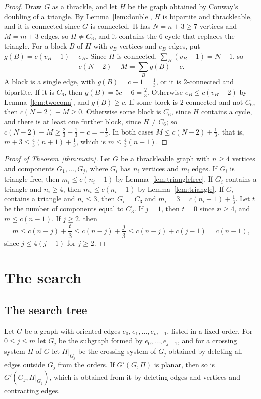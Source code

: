 \documentclass[11pt]{amsart}
\theoremstyle{definition}
\theoremstyle{remark}
\numberwithin{equation}{section}
\begin{document}
\begin{proof}
Draw $G$ as a thrackle, and let $H$ be the graph obtained by Conway's doubling of a triangle. By Lemma~\ref{lem:double}, $H$ is bipartite and thrackleable, and it is connected since $G$ is connected. It has $N=n+3\ge7$ vertices and $M=m+3$ edges, so $H\ne C_6$, and it contains the $6$-cycle that replaces the triangle. For a block $B$ of $H$ with $v_B$ vertices and $e_B$ edges, put $g(B)=c(v_B-1)-e_B$. Since $H$ is connected, $\sum_B(v_B-1)=N-1$, so
\[
c(N-2)-M=\sum_Bg(B)-c.
\]
A block is a single edge, with $g(B)=c-1=\frac13$, or it is $2$-connected and bipartite. If it is $C_6$, then $g(B)=5c-6=\frac23$. Otherwise $e_B\le c(v_B-2)$ by Lemma~\ref{lem:twoconn}, and $g(B)\ge c$. If some block is $2$-connected and not $C_6$, then $c(N-2)-M\ge0$. Otherwise some block is $C_6$, since $H$ contains a cycle, and there is at least one further block, since $H\ne C_6$; so $c(N-2)-M\ge\frac23+\frac13-c=-\frac13$. In both cases $M\le c(N-2)+\frac13$, that is, $m+3\le\frac43(n+1)+\frac13$, which is $m\le\frac43(n-1)$.
\end{proof}

\begin{proof}[Proof of Theorem~\ref{thm:main}]
Let $G$ be a thrackleable graph with $n\ge4$ vertices and components $G_1,\dots,G_j$, where $G_i$ has $n_i$ vertices and $m_i$ edges. If $G_i$ is triangle-free, then $m_i\le c(n_i-1)$ by Lemma~\ref{lem:trianglefree}. If $G_i$ contains a triangle and $n_i\ge4$, then $m_i\le c(n_i-1)$ by Lemma~\ref{lem:triangle}. If $G_i$ contains a triangle and $n_i\le3$, then $G_i=C_3$ and $m_i=3=c(n_i-1)+\frac13$. Let $t$ be the number of components equal to $C_3$. If $j=1$, then $t=0$ since $n\ge4$, and $m\le c(n-1)$. If $j\ge2$, then
\[
m\le c(n-j)+\frac t3\le c(n-j)+\frac j3\le c(n-j)+c(j-1)=c(n-1),
\]
since $j\le4(j-1)$ for $j\ge2$.
\end{proof}

\section{The search}\label{sec:search}

\subsection{The search tree}
Let $G$ be a graph with oriented edges $e_0,e_1,\dots,e_{m-1}$, listed in a fixed order. For $0\le j\le m$ let $G_j$ be the subgraph formed by $e_0,\dots,e_{j-1}$, and for a crossing system $\Pi$ of $G$ let $\Pi|_{G_j}$ be the crossing system of $G_j$ obtained by deleting all edges outside $G_j$ from the orders. If $G'(G,\Pi)$ is planar, then so is $G'(G_j,\Pi|_{G_j})$, which is obtained from it by deleting edges and vertices and contracting edges.
\end{document}
